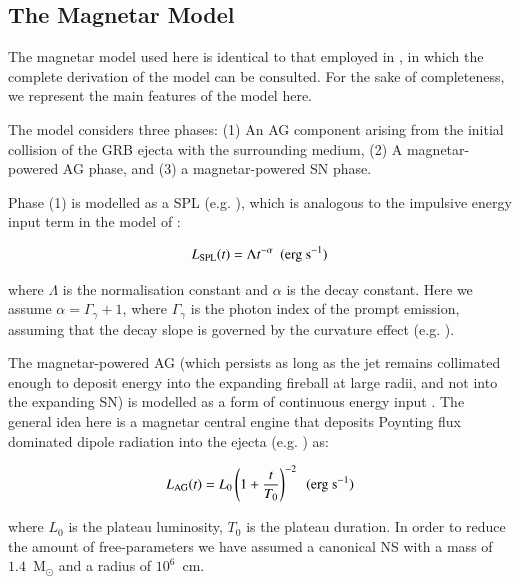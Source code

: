 \documentclass[traditabstract,longauth]{aa}
\begin{document}
\begin{appendix}
\section{The Magnetar Model}
\label{sec:app_magnetar}


The magnetar model used here is identical to that employed in \citet{CJM16}, in which the complete derivation of the model can be consulted.  For the sake of completeness, we represent the main features of the model here.

The model considers three phases: (1) An AG component arising from the initial collision of the GRB ejecta with the surrounding medium, (2) A magnetar-powered AG phase, and (3) a magnetar-powered SN phase.

Phase (1) is modelled as a SPL (e.g. \citealt{Rowlinson13,Cano15}), which is analogous to the impulsive energy input term in the model of \citet{ZhangMesz01}:

\begin{equation}
L_{\rm SPL} (t) = \Lambda t^{-\alpha} \hspace{5pt} ({\rm erg~s^{-1}})
\label{equ:SPL}
\end{equation}

\noindent where $\Lambda$ is the normalisation constant and $\alpha$ is the decay constant.  Here we assume $\alpha = \Gamma_{\gamma} + 1$, where $\Gamma_{\gamma}$ is the photon index of the prompt emission, assuming that the decay slope is governed by the curvature effect (e.g. \citealt{KumarPan00,Piran04}).


The magnetar-powered AG (which persists as long as the jet remains collimated enough to deposit energy into the expanding fireball at large radii, and not into the expanding SN) is modelled as a form of continuous energy input \citep{ZhangMesz01}.  The general idea here is a magnetar central engine that deposits Poynting flux dominated dipole radiation into the ejecta (e.g. \citealt{Dallosso11}) as:

\begin{equation}
L_{\rm AG}(t)=L_{0}\left(1+\frac{t}{T_{0}}\right)^{-2} \hspace{5pt} ({\rm erg~s^{-1}})
\label{equ:magnetar_AG}
\end{equation}


\noindent where $L_{0}$ is the plateau luminosity, $T_{0}$ is the plateau duration.  In order to reduce the amount of free-parameters we have assumed a canonical NS with a mass of $1.4$~M$_{\odot}$ and a radius of $10^{6}$~cm.



\end{appendix}
\end{document}
